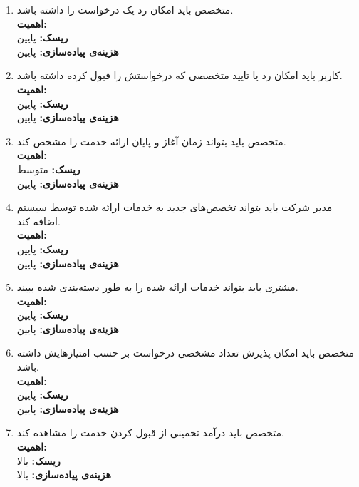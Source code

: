 \begin{enumerate}
	\item
	متخصص باید امکان رد یک درخواست را داشته باشد.
	\\
	\textbf{اهمیت:} 
	\\
	\textbf{ریسک:} پایین
	\\
	\textbf{هزینه‌ی پیاده‌سازی:} پایین
	
	\item
	کاربر باید امکان رد یا تایید متخصصی که درخواستش را قبول کرده داشته باشد.
	\\
	\textbf{اهمیت:} 
	\\
	\textbf{ریسک:} پایین
	\\
	\textbf{هزینه‌ی پیاده‌سازی:} پایین
	
		\item
	متخصص باید بتواند زمان آغاز و پایان ارائه خدمت را مشخص کند.
	\\
	\textbf{اهمیت:} 
	\\
	\textbf{ریسک:} متوسط
	\\
	\textbf{هزینه‌ی پیاده‌سازی:} پایین
	
	
			\item
مدیر شرکت باید بتواند تخصص‌‌های جدید به خدمات ارائه شده توسط سیستم اضافه کند.
	\\
	\textbf{اهمیت:} 
	\\
	\textbf{ریسک:} پایین
	\\
	\textbf{هزینه‌ی پیاده‌سازی:} پایین
	
				\item
مشتری باید بتواند خدمات ارائه شده را به طور دسته‌بندی شده ببیند.
	\\
	\textbf{اهمیت:} 
	\\
	\textbf{ریسک:} پایین
	\\
	\textbf{هزینه‌ی پیاده‌سازی:} پایین
	
	\item
	متخصص باید امکان پذیرش تعداد مشخصی درخواست بر حسب امتیازهایش داشته باشد.
	\\
	\textbf{اهمیت:} 
	\\
	\textbf{ریسک:} پایین
	\\
	\textbf{هزینه‌ی پیاده‌سازی:} پایین
	
		\item
	متخصص باید درآمد تخمینی از قبول کردن خدمت را مشاهده کند.
	\\
	\textbf{اهمیت:} 
	\\
	\textbf{ریسک:} بالا
	\\
	\textbf{هزینه‌ی پیاده‌سازی:} بالا
	

\end{enumerate}
